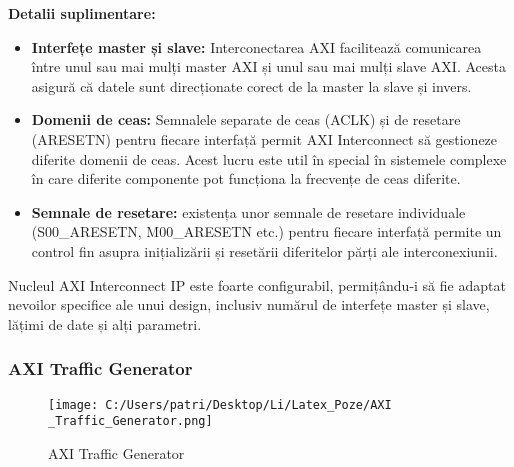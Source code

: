 \documentclass[12pt]{article}
\begin{document}
\hspace*{1cm} \textbf{Detalii suplimentare:}
\begin{itemize}
    \item \textbf{Interfețe master și slave:} Interconectarea AXI facilitează comunicarea între unul sau mai mulți master AXI și unul sau mai mulți slave AXI. Acesta asigură că datele sunt direcționate corect de la master la slave și invers.
    \item \textbf{Domenii de ceas:} Semnalele separate de ceas (ACLK) și de resetare (ARESETN) pentru fiecare interfață permit AXI Interconnect să gestioneze diferite domenii de ceas. Acest lucru este util în special în sistemele complexe în care diferite componente pot funcționa la frecvențe de ceas diferite.
    \item \textbf{Semnale de resetare:} existența unor semnale de resetare individuale (S00\_ARESETN, M00\_ARESETN etc.) pentru fiecare interfață permite un control fin asupra inițializării și resetării diferitelor părți ale interconexiunii.\\
\end{itemize}
\hspace*{1cm}Nucleul AXI Interconnect IP este foarte configurabil, permițându-i să fie adaptat nevoilor specifice ale unui design, inclusiv numărul de interfețe master și slave, lățimi de date și alți parametri.



\subsubsection{AXI Traffic Generator}

\begin{figure}[H]
    \centering
    \texttt{[image: C:/Users/patri/Desktop/Li/Latex\_Poze/AXI \_Traffic\_Generator.png]}
    \caption{AXI Traffic Generator}
\end{figure}
\end{document}
